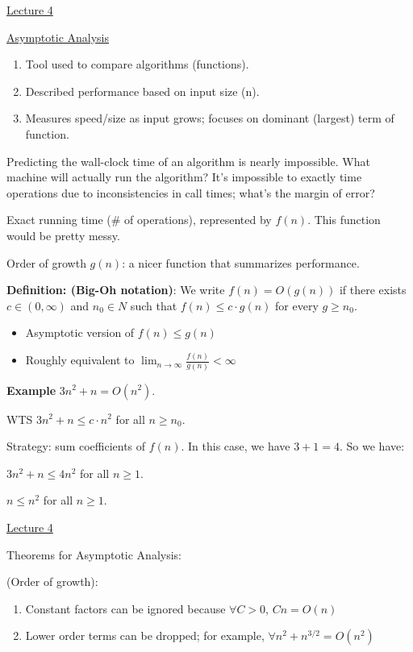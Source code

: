 \documentclass[12pt]{article}
\begin{document}
\underline{Lecture 4}

\underline{Asymptotic Analysis}

\begin{enumerate}
    \item Tool used to compare algorithms (functions).
    \item Described performance based on input size (n).
    \item Measures speed/size as input grows; focuses on dominant (largest) term of function.
\end{enumerate}

Predicting the wall-clock time of an algorithm is nearly impossible. What machine will actually run the algorithm? It's impossible to exactly time operations due to inconsistencies in call times; what's the margin of error?

Exact running time (# of operations), represented by $f(n)$. This function would be pretty messy.

Order of growth $g(n)$: a nicer function that summarizes performance.

\textbf{Definition: (Big-Oh notation)}: We write $f(n) = O(g(n))$ if there exists $c \in (0, \infty)$ and $n_0 \in N$ such that $f(n) \leq c \cdot g(n)$ for every $g \geq n_0$. \begin{itemize}
    \item Asymptotic version of $f(n) \leq g(n)$
    \item Roughly equivalent to $\lim_{n \to \infty} \frac{f(n)}{g(n)} < \infty$
\end{itemize}

\textbf{Example} $3n^2 + n = O(n^2)$.

WTS $3n^2 + n \leq c \cdot n^2$ for all $n \geq n_0$.

Strategy: sum coefficients of $f(n)$. In this case, we have $3 + 1 = 4$. So we have:

$3n^2 + n \leq 4n^2$ for all $n \geq 1$.

$n \leq n^2$ for all $n \geq 1$.

\underline{Lecture 4}

Theorems for Asymptotic Analysis:

(Order of growth): \begin{enumerate}
    \item Constant factors can be ignored because $\forall C > 0$, $Cn = O(n)$
    \item Lower order terms can be dropped; for example, $\forall n^2 + n^{3/2} = O(n^2)$
\end{enumerate}
\end{document}
